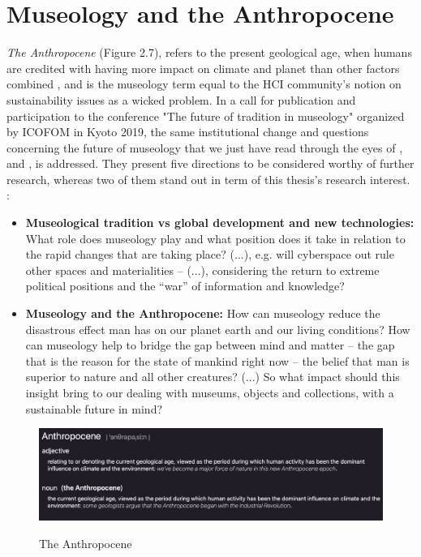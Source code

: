 \section{Museology and the Anthropocene}
\emph{The Anthropocene} (Figure 2.7), refers to the present geological age, when humans are credited with having more impact on climate and planet than other factors combined \autocite{light_design_2017}, and is the museology term equal to the HCI community's notion on sustainability issues as a wicked problem. In a call for publication and participation to the conference "The future of tradition in museology" organized by ICOFOM in Kyoto 2019, the same institutional change and questions concerning the future of museology that we just have read through the eyes of \autocite{ross_interpreting_2015}, \autocite{vergo_museology_1989} and \autocite{vermeeren_museum_2018}, is addressed. They present five directions to be considered worthy of further research, whereas two of them stand out in term of this thesis's research interest. \autocite[p. 4]{icofom_kyoto_2019}:

\begin{itemize}
    \item \textbf{Museological tradition vs global development and new technologies:} What role does museology play and what position does it take in relation to the rapid changes that are taking place? (...), e.g. will cyberspace out rule other spaces and materialities – (...), considering the return to extreme political positions and the “war” of information and knowledge?
    \item \textbf{Museology and the Anthropocene:} How can museology reduce the disastrous effect man has on our planet earth and our living conditions? How can museology help to bridge the gap between mind and matter – the gap that is the reason for the state of mankind right now – the belief that man is superior to nature and all other creatures? (...) So what impact should this insight bring to our dealing with museums, objects and collections, with a sustainable future in mind?
\end{itemize}

\begin{figure}[H]
\includegraphics[width=12.5cm]{pictures/background/anthropocene.png}
\caption{The Anthropocene}{\autocite{Oxford_dictionary}}
\centering
\end{figure}

